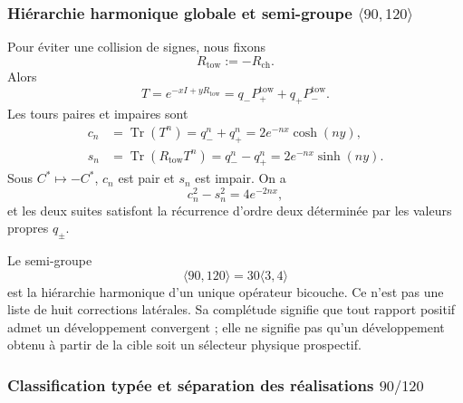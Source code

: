 \subsubsection{Hiérarchie harmonique globale et semi-groupe \(\langle90,120\rangle\)}

Pour éviter une collision de signes, nous fixons
\[
R_{\mathrm{tow}}:=-R_{\mathrm{ch}}.
\]
Alors
\begin{equation}
T=e^{-xI+yR_{\mathrm{tow}}}
=q_-P_+^{\mathrm{tow}}+q_+P_-^{\mathrm{tow}}.
\label{eq:tower-operator}
\end{equation}
Les tours paires et impaires sont
\begin{align}
c_n&=\operatorname{Tr}(T^n)
=q_-^n+q_+^n
=2e^{-nx}\cosh(ny),
\label{eq:cn}\\
s_n&=\operatorname{Tr}(R_{\mathrm{tow}}T^n)
=q_-^n-q_+^n
=2e^{-nx}\sinh(ny).
\label{eq:sn}
\end{align}
Sous \(C^*\mapsto-C^*\), \(c_n\) est pair et \(s_n\) est impair. On a
\begin{equation}
c_n^2-s_n^2=4e^{-2nx},
\label{eq:tower-invariant}
\end{equation}
et les deux suites satisfont la récurrence d'ordre deux déterminée par les
valeurs propres \(q_\pm\).

Le semi-groupe
\begin{equation}
\langle90,120\rangle=30\langle3,4\rangle
\label{eq:semigroup}
\end{equation}
est la hiérarchie harmonique d'un unique opérateur bicouche. Ce n'est pas une liste de huit
corrections latérales. Sa complétude signifie que tout rapport positif
admet un développement convergent ; elle ne signifie pas qu'un développement obtenu à
partir de la cible soit un sélecteur physique prospectif.

\subsubsection{Classification typée et séparation des réalisations \(90/120\)}

